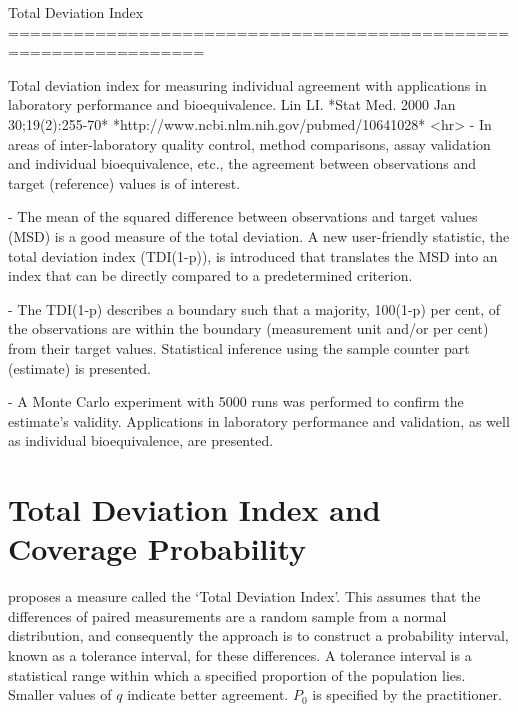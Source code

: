 \documentclass[MAIN.tex]{subfiles}
\begin{document}
Total Deviation Index
================================================================

Total deviation index for measuring individual agreement with applications in laboratory performance and bioequivalence.
Lin LI.
*Stat Med. 2000 Jan 30;19(2):255-70*
*http://www.ncbi.nlm.nih.gov/pubmed/10641028*
<hr>
- In areas of inter-laboratory quality control, method comparisons, assay validation and individual bioequivalence, etc., 
the agreement between observations and target (reference) values is of interest. 

- The mean of the squared difference between observations and target values (MSD) is a good measure of the total deviation. 
A new user-friendly statistic, the total deviation index (TDI(1-p)), is introduced that translates the MSD into an index
that can be directly compared to a predetermined criterion. 

- The TDI(1-p) describes a boundary such that a majority, 100(1-p) per cent, of the observations are within the boundary
(measurement unit and/or per cent) from their target values. Statistical inference using the sample counter part
(estimate) is presented. 

- A Monte Carlo experiment with 5000 runs was performed to confirm the estimate's validity.
Applications in laboratory performance and validation, as well as individual bioequivalence, are presented.
	
	\section{Total Deviation Index and Coverage Probability}
	
	
	\citet{lin2002} proposes a measure called the `Total Deviation Index'. 
	This assumes that the differences of paired measurements are a random sample from a normal distribution, 
	and consequently the approach is to construct a probability interval, known as a tolerance interval, 
	for these differences. A tolerance interval is a statistical range within which a specified proportion 
	of the population lies.
	Smaller values of $q$ indicate better agreement. $P_{0}$ is specified by the practitioner.
	
\end{document}
